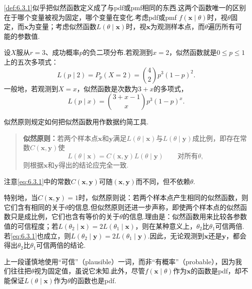 \autoref{def:6.3.1}似乎把似然函数定义成了与pdf或pmf相同的东西.这两个函数唯一的区别在于哪个变量被视为固定，哪个变量在变化.考虑pdf或pmf $f(\boldsymbol x\mid\theta)$时，视$\theta$固定，而$\boldsymbol x$为变量；考虑似然函数$L(\theta\mid\boldsymbol x)$时，视$\boldsymbol x$为观测样本点，而$\theta$遍历所有可能的参数值.
\begin{example}[负二项似然]\label{ex:6.3.2}
设$X$服从$r=3$、成功概率$p$的负二项分布.若观测到$x=2$，似然函数就是$0\le p\le1$上的五次多项式：
$$L(p\mid2)=P_p(X=2)=\binom42p^3(1-p)^2.$$
一般地，若观测到$X=x$，似然函数是次数为$3+x$的多项式，
$$L(p\mid x)=\binom{3+x-1}{x}p^3(1-p)^x.$$
\end{example}
似然原则规定如何把似然函数用作数据约简工具.
\begin{quote}
\textbf{似然原则：}若两个样本点$\boldsymbol x$和$\boldsymbol y$满足$L(\theta\mid\boldsymbol x)$与$L(\theta\mid\boldsymbol y)$成比例，即存在常数$C(\boldsymbol x,\boldsymbol y)$使
\begin{equation}\label{eq:6.3.1}
L(\theta\mid\boldsymbol x)=C(\boldsymbol x,\boldsymbol y)L(\theta\mid\boldsymbol y)\qquad\text{对所有$\theta$},
\end{equation}
则根据$\boldsymbol x$和$\boldsymbol y$得出的结论应完全一致.
\end{quote}
注意\eqref{eq:6.3.1}中的常数$C(\boldsymbol x,\boldsymbol y)$可随$(\boldsymbol x,\boldsymbol y)$而不同，但不依赖$\theta$.

特别地，当$C(\boldsymbol x,\boldsymbol y)=1$时，似然原则说：若两个样本点产生相同的似然函数，则它们含有相同的关于$\theta$的信息.但似然原则还进一步声称，即使两个样本点的似然函数只是成比例，它们也含有等价的关于$\theta$的信息.理由是：似然函数用来比较各参数值的可信程度；若$L(\theta_2\mid\boldsymbol x)=2L(\theta_1\mid\boldsymbol x)$，则在某种意义上，$\theta_2$比$\theta_1$可信两倍.若\eqref{eq:6.3.1}也成立，则$L(\theta_2\mid\boldsymbol y)=2L(\theta_1\mid\boldsymbol y)$.因此，无论观测到$\boldsymbol x$还是$\boldsymbol y$，都会得出$\theta_2$比$\theta_1$可信两倍的结论.

上一段谨慎地使用“可信”（plausible）一词，而非“有概率”（probable），因为我们往往把$\theta$视为固定值，虽说它未知.此外，尽管$f(\boldsymbol x\mid\theta)$作为$\boldsymbol x$的函数是pdf，却不能保证$L(\theta\mid\boldsymbol x)$作为$\theta$的函数也是pdf.

